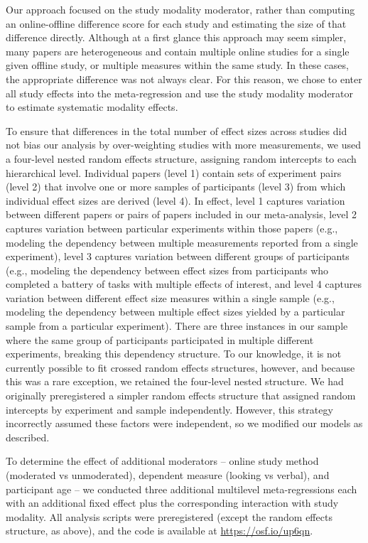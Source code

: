 \documentclass[
  man,floatsintext]{apa6}
\begin{document}
Our approach focused on the study modality moderator, rather than computing an online-offline difference score for each study and estimating the size of that difference directly. Although at a first glance this approach may seem simpler, many papers are heterogeneous and contain multiple online studies for a single given offline study, or multiple measures within the same study. In these cases, the appropriate difference was not always clear. For this reason, we chose to enter all study effects into the meta-regression and use the study modality moderator to estimate systematic modality effects.

To ensure that differences in the total number of effect sizes across studies did not bias our analysis by over-weighting studies with more measurements, we used a four-level nested random effects structure, assigning random intercepts to each hierarchical level. Individual papers (level 1) contain sets of experiment pairs (level 2) that involve one or more samples of participants (level 3) from which individual effect sizes are derived (level 4). In effect, level 1 captures variation between different papers or pairs of papers included in our meta-analysis, level 2 captures variation between particular experiments within those papers (e.g., modeling the dependency between multiple measurements reported from a single experiment), level 3 captures variation between different groups of participants (e.g., modeling the dependency between effect sizes from participants who completed a battery of tasks with multiple effects of interest, and level 4 captures variation between different effect size measures within a single sample (e.g., modeling the dependency between multiple effect sizes yielded by a particular sample from a particular experiment). There are three instances in our sample where the same group of participants participated in multiple different experiments, breaking this dependency structure. To our knowledge, it is not currently possible to fit crossed random effects structures, however, and because this was a rare exception, we retained the four-level nested structure. We had originally preregistered a simpler random effects structure that assigned random intercepts by experiment and sample independently. However, this strategy incorrectly assumed these factors were independent, so we modified our models as described.

To determine the effect of additional moderators -- online study method (moderated vs unmoderated), dependent measure (looking vs verbal), and participant age -- we conducted three additional multilevel meta-regressions each with an additional fixed effect plus the corresponding interaction with study modality. All analysis scripts were preregistered (except the random effects structure, as above), and the code is available at \href{}{https://osf.io/up6qn}.
\end{document}
